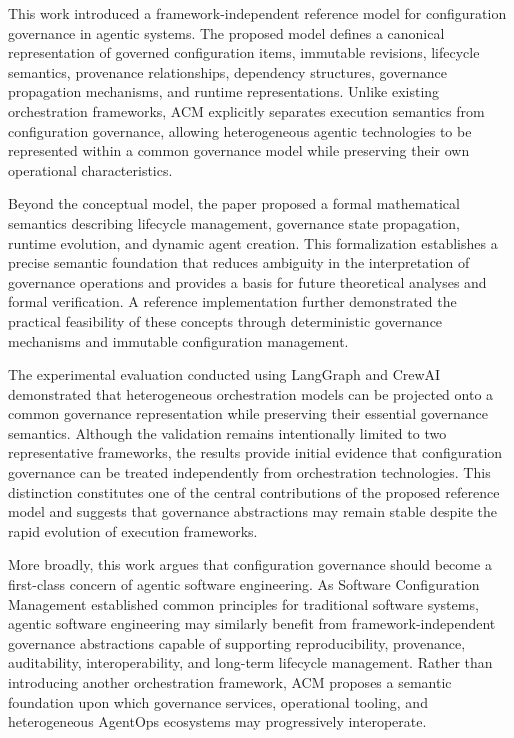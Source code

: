 \documentclass[10pt]{article}
\begin{document}
This work introduced a framework-independent reference model for configuration governance in agentic systems. The proposed model defines a canonical representation of governed configuration items, immutable revisions, lifecycle semantics, provenance relationships, dependency structures, governance propagation mechanisms, and runtime representations. Unlike existing orchestration frameworks, ACM explicitly separates execution semantics from configuration governance, allowing heterogeneous agentic technologies to be represented within a common governance model while preserving their own operational characteristics.

Beyond the conceptual model, the paper proposed a formal mathematical semantics describing lifecycle management, governance state propagation, runtime evolution, and dynamic agent creation. This formalization establishes a precise semantic foundation that reduces ambiguity in the interpretation of governance operations and provides a basis for future theoretical analyses and formal verification. A reference implementation further demonstrated the practical feasibility of these concepts through deterministic governance mechanisms and immutable configuration management.

The experimental evaluation conducted using LangGraph and CrewAI demonstrated that heterogeneous orchestration models can be projected onto a common governance representation while preserving their essential governance semantics. Although the validation remains intentionally limited to two representative frameworks, the results provide initial evidence that configuration governance can be treated independently from orchestration technologies. This distinction constitutes one of the central contributions of the proposed reference model and suggests that governance abstractions may remain stable despite the rapid evolution of execution frameworks.

More broadly, this work argues that configuration governance should become a first-class concern of agentic software engineering. As Software Configuration Management established common principles for traditional software systems, agentic software engineering may similarly benefit from framework-independent governance abstractions capable of supporting reproducibility, provenance, auditability, interoperability, and long-term lifecycle management. Rather than introducing another orchestration framework, ACM proposes a semantic foundation upon which governance services, operational tooling, and heterogeneous AgentOps ecosystems may progressively interoperate.
\end{document}
